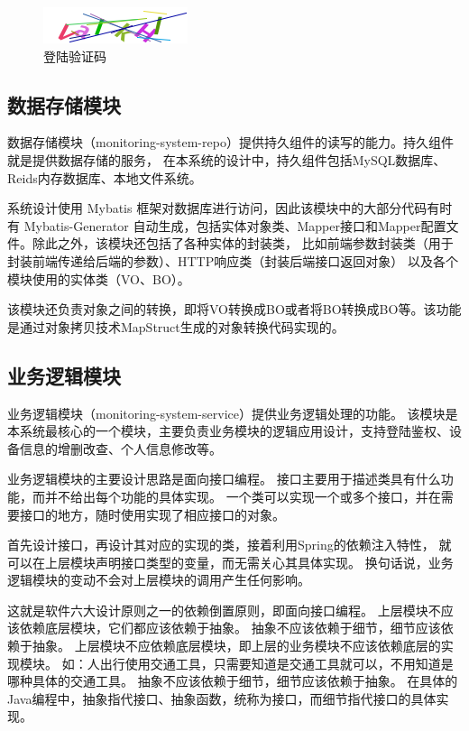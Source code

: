 \begin{figure}[ht]
    \centering
    \includegraphics[width=0.5\linewidth]{./Figure/IMG_code.png}
    \caption{登陆验证码}\label{Fig:code}
\end{figure}

\subsection{数据存储模块}
数据存储模块（monitoring-system-repo）提供持久组件的读写的能力。持久组件就是提供数据存储的服务，
在本系统的设计中，持久组件包括MySQL数据库、Reids内存数据库、本地文件系统。

系统设计使用 Mybatis 框架对数据库进行访问，因此该模块中的大部分代码有时有 Mybatis-Generator
自动生成，包括实体对象类、Mapper接口和Mapper配置文件。除此之外，该模块还包括了各种实体的封装类，
比如前端参数封装类（用于封装前端传递给后端的参数）、HTTP响应类（封装后端接口返回对象）
以及各个模块使用的实体类（VO、BO）。

该模块还负责对象之间的转换，即将VO转换成BO或者将BO转换成BO等。该功能是通过对象拷贝技术MapStruct生成的对象转换代码实现的。

\subsection{业务逻辑模块}
业务逻辑模块（monitoring-system-service）提供业务逻辑处理的功能。
该模块是本系统最核心的一个模块，主要负责业务模块的逻辑应用设计，支持登陆鉴权、设备信息的增删改查、个人信息修改等。

业务逻辑模块的主要设计思路是面向接口编程。
接口主要用于描述类具有什么功能，而并不给出每个功能的具体实现。
一个类可以实现一个或多个接口，并在需要接口的地方，随时使用实现了相应接口的对象。

首先设计接口，再设计其对应的实现的类，接着利用Spring的依赖注入特性，
就可以在上层模块声明接口类型的变量，而无需关心其具体实现。
换句话说，业务逻辑模块的变动不会对上层模块的调用产生任何影响。

这就是软件六大设计原则之一的依赖倒置原则，即面向接口编程。
上层模块不应该依赖底层模块，它们都应该依赖于抽象。
抽象不应该依赖于细节，细节应该依赖于抽象。
上层模块不应依赖底层模块，即上层的业务模块不应该依赖底层的实现模块。
如：人出行使用交通工具，只需要知道是交通工具就可以，不用知道是哪种具体的交通工具。
抽象不应该依赖于细节，细节应该依赖于抽象。
在具体的Java编程中，抽象指代接口、抽象函数，统称为接口，而细节指代接口的具体实现。


